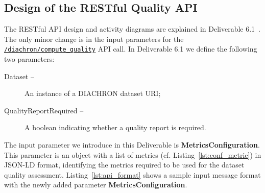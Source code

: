 
\subsection{Design of the RESTful Quality API}
\label{sec:RestAPI} 
The RESTful API design and activity diagrams are explained in Deliverable 6.1~\cite[Section 6.1.7]{diachron-d6.1}.
The only minor change is in the input parameters for the \texttt{\url{/diachron/compute_quality}} API call.
In Deliverable 6.1 we define the following two parameters:
\begin{description}
\item[Dataset –] An instance of a DIACHRON dataset URI;
\item[QualityReportRequired –] A boolean indicating whether a quality report is required.
\end{description}
The input parameter we introduce in this Deliverable is \textbf{MetricsConfiguration}.
This parameter is an object with a list of metrics (cf. Listing~\ref{lst:conf_metric}) in JSON-LD format, identifying the metrics required to be used for the dataset quality assessment.
Listing~\ref{lst:api_format} shows a sample input message format with the newly added parameter \textbf{MetricsConfiguration}.
 

